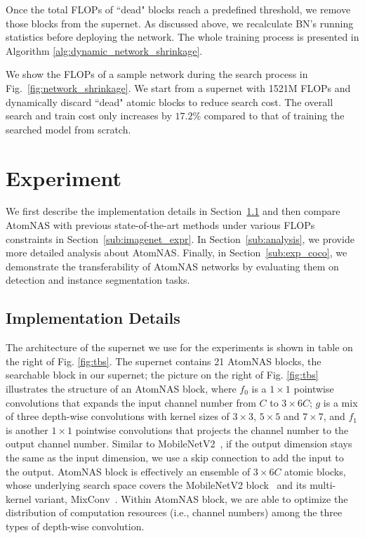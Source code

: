 \documentclass{article} \usepackage{iclr2020_conference,times}
\newcommand{\flops}{FLOPs\xspace}
\begin{document}
Once the total \flops of ``dead" blocks reach a predefined threshold, we remove those blocks from the supernet. As discussed above, we recalculate BN's running statistics before deploying the network. The whole training process is presented in Algorithm \ref{alg:dynamic_network_shrinkage}.

We show the \flops of a sample network during the search process in Fig.~\ref{fig:network_shrinkage}. We start from a supernet with 1521M \flops and dynamically discard ``dead" atomic blocks to reduce search cost. The overall search and train cost only increases by $17.2\%$ compared to that of training the searched model from scratch.






\section{Experiment}

We first describe the implementation details in Section~\ref{sub:impl} and then compare AtomNAS with previous state-of-the-art methods under various \flops constraints in Section~\ref{sub:imagenet_expr}. 
In Section~\ref{sub:analysis}, we provide more detailed analysis about AtomNAS. Finally, in Section~\ref{sub:exp_coco}, we demonstrate the transferability of AtomNAS networks by evaluating them on detection and instance segmentation tasks.



\subsection{Implementation Details}
\label{sub:impl}

The architecture of the supernet we use for the experiments is shown in table on the right of Fig. \ref{fig:tbs}. The supernet contains 21 AtomNAS blocks, the searchable block in our supernet; the picture on the right of Fig. \ref{fig:tbs} illustrates the structure of an AtomNAS block, where $f_0$ is a $1\times1$ pointwise convolutions that expands the input channel number from $C$ to $3\times6C$; $g$ is a mix of three depth-wise convolutions with kernel sizes of $3\times3$, $5\times5$ and $7\times7$, and $f_1$ is another $1\times1$ pointwise convolutions that projects the channel number to the output channel number. Similar to MobileNetV2~\citep{sandler2018mobilenetv2}, if the output dimension stays the same as the input dimension, we use a skip connection to add the input to the output. AtomNAS block is effectively an ensemble of $3\times6C$ atomic blocks, whose underlying search space covers the MobileNetV2 block~\citep{sandler2018mobilenetv2} and its multi-kernel variant, MixConv~\citep{tan2019mixnet}. Within AtomNAS block, we are able to optimize the distribution of computation resources (i.e., channel numbers) among the three types of depth-wise convolution.
\end{document}
